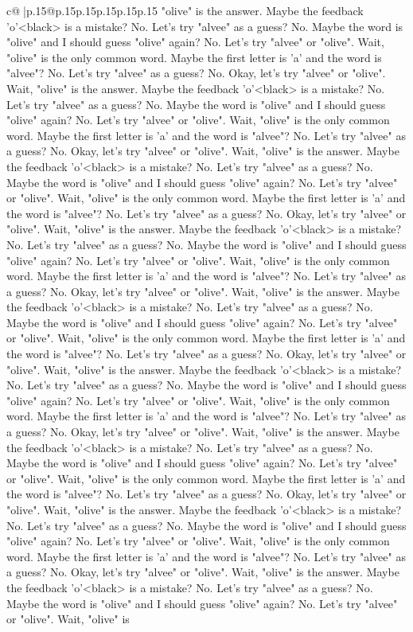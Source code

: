 \documentclass{article}
\begin{document}
{\begin{supertabular}{c@{$\;$}|p{.15\linewidth}@{}p{.15\linewidth}p{.15\linewidth}p{.15\linewidth}p{.15\linewidth}p{.15\linewidth}}
{{{"olive" is the answer. Maybe the feedback 'o'<black> is a mistake? No. Let's try "alvee" as a guess? No. Maybe the word is "olive" and I should guess "olive" again? No. Let's try "alvee" or "olive". Wait, "olive" is the only common word. Maybe the first letter is 'a' and the word is "alvee"? No. Let's try "alvee" as a guess? No. Okay, let's try "alvee" or "olive". Wait, "olive" is the answer. Maybe the feedback 'o'<black> is a mistake? No. Let's try "alvee" as a guess? No. Maybe the word is "olive" and I should guess "olive" again? No. Let's try "alvee" or "olive". Wait, "olive" is the only common word. Maybe the first letter is 'a' and the word is "alvee"? No. Let's try "alvee" as a guess? No. Okay, let's try "alvee" or "olive". Wait, "olive" is the answer. Maybe the feedback 'o'<black> is a mistake? No. Let's try "alvee" as a guess? No. Maybe the word is "olive" and I should guess "olive" again? No. Let's try "alvee" or "olive". Wait, "olive" is the only common word. Maybe the first letter is 'a' and the word is "alvee"? No. Let's try "alvee" as a guess? No. Okay, let's try "alvee" or "olive". Wait, "olive" is the answer. Maybe the feedback 'o'<black> is a mistake? No. Let's try "alvee" as a guess? No. Maybe the word is "olive" and I should guess "olive" again? No. Let's try "alvee" or "olive". Wait, "olive" is the only common word. Maybe the first letter is 'a' and the word is "alvee"? No. Let's try "alvee" as a guess? No. Okay, let's try "alvee" or "olive". Wait, "olive" is the answer. Maybe the feedback 'o'<black> is a mistake? No. Let's try "alvee" as a guess? No. Maybe the word is "olive" and I should guess "olive" again? No. Let's try "alvee" or "olive". Wait, "olive" is the only common word. Maybe the first letter is 'a' and the word is "alvee"? No. Let's try "alvee" as a guess? No. Okay, let's try "alvee" or "olive". Wait, "olive" is the answer. Maybe the feedback 'o'<black> is a mistake? No. Let's try "alvee" as a guess? No. Maybe the word is "olive" and I should guess "olive" again? No. Let's try "alvee" or "olive". Wait, "olive" is the only common word. Maybe the first letter is 'a' and the word is "alvee"? No. Let's try "alvee" as a guess? No. Okay, let's try "alvee" or "olive". Wait, "olive" is the answer. Maybe the feedback 'o'<black> is a mistake? No. Let's try "alvee" as a guess? No. Maybe the word is "olive" and I should guess "olive" again? No. Let's try "alvee" or "olive". Wait, "olive" is the only common word. Maybe the first letter is 'a' and the word is "alvee"? No. Let's try "alvee" as a guess? No. Okay, let's try "alvee" or "olive". Wait, "olive" is the answer. Maybe the feedback 'o'<black> is a mistake? No. Let's try "alvee" as a guess? No. Maybe the word is "olive" and I should guess "olive" again? No. Let's try "alvee" or "olive". Wait, "olive" is the only common word. Maybe the first letter is 'a' and the word is "alvee"? No. Let's try "alvee" as a guess? No. Okay, let's try "alvee" or "olive". Wait, "olive" is the answer. Maybe the feedback 'o'<black> is a mistake? No. Let's try "alvee" as a guess? No. Maybe the word is "olive" and I should guess "olive" again? No. Let's try "alvee" or "olive". Wait, "olive" is }}}
\end{supertabular}}
\end{document}
